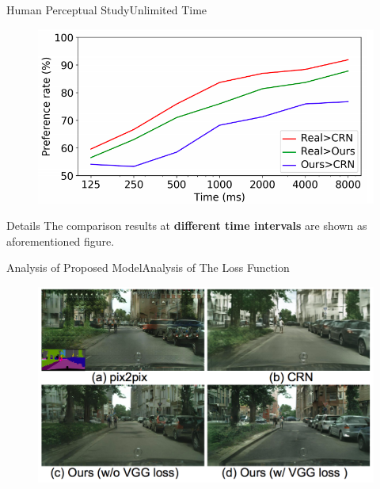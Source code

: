 \documentclass{beamer}
\begin{document}
\begin{frame}{Human Perceptual Study}{Unlimited Time}
\begin{figure}
	\centering
	\includegraphics[height=0.45\textheight]{images/limite_time}
\end{figure}
%
%
\begin{beamerboxesrounded}[upper=uppercol,lower=lowercol,shadow=false]{Details }
The comparison results at \textbf{different time intervals} are shown as aforementioned figure.
\end{beamerboxesrounded}
\end{frame}

\begin{frame}{Analysis of Proposed Model}{Analysis of The Loss Function}
\begin{figure}
	\centering
	\includegraphics[height=0.8\textheight]{images/result_1}
\end{figure}
\end{frame}
\end{document}
